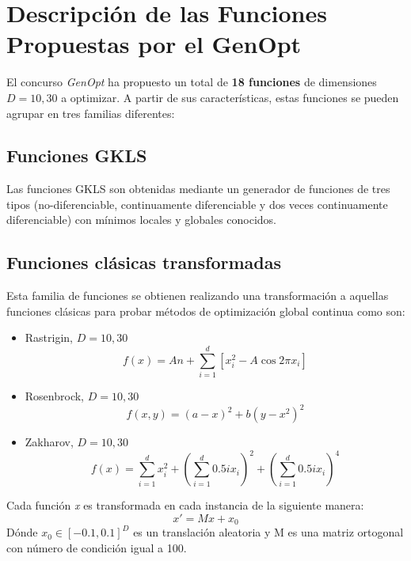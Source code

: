 \section{Descripción de las Funciones Propuestas por el GenOpt}
\label{sec:GENOPT}

El concurso \textit{GenOpt} ha propuesto un total de \textbf{18 funciones} de dimensiones $D = 10, 30$ a optimizar. A partir de sus características, estas funciones se pueden agrupar en tres familias diferentes: 

\bigskip
\subsection{Funciones GKLS}\label{sec:GKLS}
Las funciones GKLS \cite{GKLS} son obtenidas mediante un generador de funciones de tres tipos (no-diferenciable, continuamente diferenciable y dos veces continuamente diferenciable) con mínimos locales y globales conocidos.
 
\subsection{Funciones clásicas transformadas}

Esta familia de funciones se obtienen realizando una transformación a aquellas funciones clásicas para probar métodos de optimización global continua como son:
    \begin{itemize}
    	\item Rastrigin, $D = 10, 30$ \\
    		\begin{equation}\label{eq:rastrigin}
					f(x) = An + \sum^{d}_{i=1}{[x^{2}_{i} - A \cos{2\pi x_{i}}]}
 					\end{equation}
    	\item Rosenbrock, $D = 10, 30$ \\
    	    \begin{equation}\label{eq:rosenbrock}
					f(x,y) = (a - x)^{2} + b(y - x^{2})^{2}
 					\end{equation}
    	\item Zakharov, $D = 10, 30$ \\
    	    \begin{equation}\label{eq:zakharov}
					f(x) = \sum^{d}_{i=1}{x_{i}^{2}} + (\sum^{d}_{i=1}{0.5ix_{i}})^{2} + (\sum^{d}_{i=1}{0.5ix_{i}})^{4}
 					\end{equation}
    \end{itemize}
    Cada función \textit{x} es transformada en cada instancia de la siguiente manera: 
    \begin{equation}
    x' = Mx + x_{0}
    \end{equation}
    Dónde $x_{0}\in[-0.1, 0.1]^{D}$ es un translación aleatoria y M es una matriz ortogonal con número de condición igual a 100.

